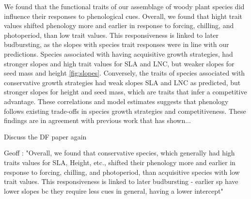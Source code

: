 \documentclass{article}\usepackage[]{graphicx}\usepackage[]{color}
\begin{document}
We found that the functional traits of our assemblage of woody plant species did influence their responses to phenological cues. Overall, we found that hight trait values shifted phenology more and earlier in response to forcing, chilling, and photoperiod, than low trait values. This responsiveness is linked to later budbursting, as the slopes with species trait responses were in line with our predictions. Species associated with having acquisitive growth strategies, had stronger slopes and high trait values for SLA and LNC, but weaker slopes for seed mass and height \ref{fig:slopes}. Conversely, the traits of species associated with conservative growth strategies had weak slopes SLA and LNC as predicted, but stronger slopes for height and seed mass, which are traits that infer a competitive advantage. These correlations and model estimates suggests that phenology follows existing trade-offs in species growth strategies and competitiveness. These findings are in agreement with previous work that has shown...


Discuss the DF paper again 

Geoff : "Overall, we found that conservative species, which generally had high traits values for SLA, Height, etc., shifted their phenology more and earlier in response to forcing, chilling, and photoperiod, than acquisitive species with low trait values. This responsiveness is linked to later budbursting - earlier sp have lower slopes bc they require less cues in general, having a lower intercept"
\end{document}
